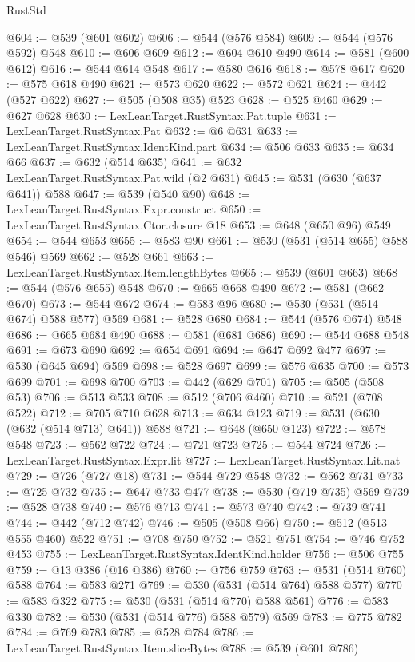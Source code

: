 \begin{lexlean}{RustStd}
\begin{coremodule}
@604 := @539 (@601 @602)
@606 := @544 (@576 @584)
@609 := @544 (@576 @592) @548
@610 := @606 @609
@612 := @604 @610 @490
@614 := @581 (@600 @612)
@616 := @544 @614 @548
@617 := @580 @616
@618 := @578 @617
@620 := @575 @618 @490
@621 := @573 @620
@622 := @572 @621
@624 := @442 (@527 @622)
@627 := @505 (@508 @35) @523
@628 := @525 @460
@629 := @627 @628
@630 := LexLeanTarget.RustSyntax.Pat.tuple
@631 := LexLeanTarget.RustSyntax.Pat
@632 := @6 @631
@633 := LexLeanTarget.RustSyntax.IdentKind.part
@634 := @506 @633
@635 := @634 @66
@637 := @632 (@514 @635)
@641 := @632 LexLeanTarget.RustSyntax.Pat.wild (@2 @631)
@645 := @531 (@630 (@637 @641)) @588
@647 := @539 (@540 @90)
@648 := LexLeanTarget.RustSyntax.Expr.construct
@650 := LexLeanTarget.RustSyntax.Ctor.closure @18
@653 := @648 (@650 @96) @549
@654 := @544 @653
@655 := @583 @90
@661 := @530 (@531 (@514 @655) @588 @546) @569
@662 := @528 @661
@663 := LexLeanTarget.RustSyntax.Item.lengthBytes
@665 := @539 (@601 @663)
@668 := @544 (@576 @655) @548
@670 := @665 @668 @490
@672 := @581 (@662 @670)
@673 := @544 @672
@674 := @583 @96
@680 := @530 (@531 (@514 @674) @588 @577) @569
@681 := @528 @680
@684 := @544 (@576 @674) @548
@686 := @665 @684 @490
@688 := @581 (@681 @686)
@690 := @544 @688 @548
@691 := @673 @690
@692 := @654 @691
@694 := @647 @692 @477
@697 := @530 (@645 @694) @569
@698 := @528 @697
@699 := @576 @635
@700 := @573 @699
@701 := @698 @700
@703 := @442 (@629 @701)
@705 := @505 (@508 @53)
@706 := @513 @533
@708 := @512 (@706 @460)
@710 := @521 (@708 @522)
@712 := @705 @710 @628
@713 := @634 @123
@719 := @531 (@630 (@632 (@514 @713) @641)) @588
@721 := @648 (@650 @123)
@722 := @578 @548
@723 := @562 @722
@724 := @721 @723
@725 := @544 @724
@726 := LexLeanTarget.RustSyntax.Expr.lit
@727 := LexLeanTarget.RustSyntax.Lit.nat
@729 := @726 (@727 @18)
@731 := @544 @729 @548
@732 := @562 @731
@733 := @725 @732
@735 := @647 @733 @477
@738 := @530 (@719 @735) @569
@739 := @528 @738
@740 := @576 @713
@741 := @573 @740
@742 := @739 @741
@744 := @442 (@712 @742)
@746 := @505 (@508 @66)
@750 := @512 (@513 @555 @460) @522
@751 := @708 @750
@752 := @521 @751
@754 := @746 @752 @453
@755 := LexLeanTarget.RustSyntax.IdentKind.holder
@756 := @506 @755
@759 := @13 @386 (@16 @386)
@760 := @756 @759
@763 := @531 (@514 @760) @588
@764 := @583 @271
@769 := @530 (@531 (@514 @764) @588 @577)
@770 := @583 @322
@775 := @530 (@531 (@514 @770) @588 @561)
@776 := @583 @330
@782 := @530 (@531 (@514 @776) @588 @579) @569
@783 := @775 @782
@784 := @769 @783
@785 := @528 @784
@786 := LexLeanTarget.RustSyntax.Item.sliceBytes
@788 := @539 (@601 @786)

\end{coremodule}
\end{lexlean}
